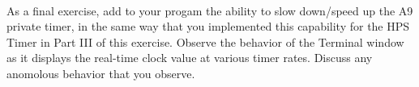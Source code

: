 \documentclass[epsfig,10pt,fullpage]{article}
\newcommand{\CommonDocsPath}{../../../../common/docs}
\begin{document}
~\\
\noindent
As a final exercise, add to your progam the ability to slow down/speed up the A9 private 
timer, in the same way that you implemented this capability for the HPS Timer in Part III
of this exercise. Observe the behavior of the Terminal window as it displays the real-time 
clock value at various timer rates.  Discuss any anomolous behavior that you observe.



\end{document}
